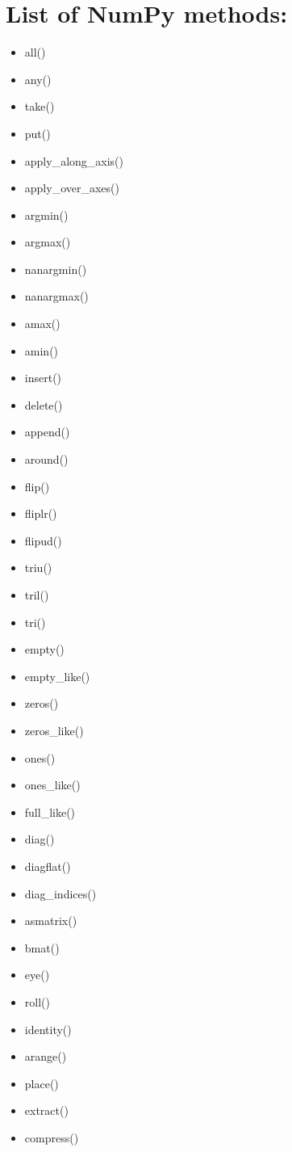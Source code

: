 \documentclass{article}
\begin{document}
\section{ List of NumPy methods:}
\begin{itemize}
  \item all()
  \item any()
  \item take()
  \item put()
  \item apply\_along\_axis()
  \item apply\_over\_axes()
  \item argmin()
  \item argmax()
  \item nanargmin()
  \item nanargmax()
  \item amax()
  \item amin()
  \item insert()
  \item delete()
  \item append()
  \item around()
  \item flip()
  \item fliplr()
  \item flipud()
  \item triu()
  \item tril()
  \item tri()
  \item empty()
  \item empty\_like()
  \item zeros()
  \item zeros\_like()
  \item ones()
  \item ones\_like()
  \item full\_like()
  \item diag()
  \item diagflat()
  \item diag\_indices()
  \item asmatrix()
  \item bmat()
  \item eye()
  \item roll()
  \item identity()
  \item arange()
  \item place()
  \item extract()
  \item compress()

\end{itemize}
\end{document}
